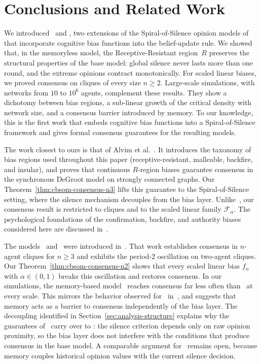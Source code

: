 \section{Conclusions and Related Work}
\label{sec:conclusions}

We introduced \CBSOMminus\ and \CBSOMplus, two extensions of the
Spiral-of-Silence opinion models of~\cite{aranda2024sound} that
incorporate cognitive bias functions into the belief-update rule.
We showed that, in the memoryless model, the Receptive-Resistant
region~$R$ preserves the structural properties of the base model: global
silence never lasts more than one round, and the extreme opinions
contract monotonically. For scaled linear biases, we proved consensus
on cliques of every size $n\ge 2$. Large-scale simulations, with networks
from $10$ to $10^6$ agents, complement these results. They show a
dichotomy between bias regions, a sub-linear growth of the critical
density with network size, and a consensus barrier introduced by
memory. To our knowledge, this is the first work that embeds cognitive
bias functions into a Spiral-of-Silence framework and gives formal
consensus guarantees for the resulting models.

The work closest to ours is that of Alvim et al.~\cite{Alvim2024}. It
introduces the taxonomy of bias regions used throughout this paper
(receptive-resistant, malleable, backfire, and insular), and proves that
continuous $R$-region biases guarantee consensus in the synchronous
DeGroot model on strongly connected graphs. Our
Theorem~\ref{thm:cbsom-consensus-n3} lifts this guarantee to the
Spiral-of-Silence setting, where the silence mechanism decouples from
the bias layer. Unlike~\cite{Alvim2024}, our consensus result is
restricted to cliques and to the scaled linear family $\mathcal{F}_\alpha$.
The psychological foundations
of the confirmation, backfire, and authority biases considered here are
discussed in~\cite{Aronson2010}.

The models \SOMminus\ and \SOMplus\ were introduced
in~\cite{aranda2024sound}. That work establishes consensus in $n$-agent
cliques for $n\ge 3$ and exhibits the period-2 oscillation on two-agent
cliques. Our Theorem~\ref{thm:cbsom-consensus-n2} shows that every
scaled linear bias $f_\alpha$ with $\alpha\in(0,1)$ breaks this
oscillation and restores consensus. In our simulations, the memory-based
model \CBSOMplus\ reaches consensus far less often than \CBSOMminus\ at
every scale. This mirrors the behavior observed for \SOMplus\
in~\cite{aranda2024sound}, and suggests that memory acts as a barrier
to consensus independently of the bias layer. The decoupling identified
in Section~\ref{sec:analysis-structure} explains why the guarantees
of~\cite{aranda2024sound} carry over to \CBSOMminus: the silence
criterion depends only on raw opinion proximity, so the bias layer does
not interfere with the conditions that produce consensus in the base
model. A comparable argument for \CBSOMplus\ remains open, because
memory couples historical opinion values with the current silence
decision.

